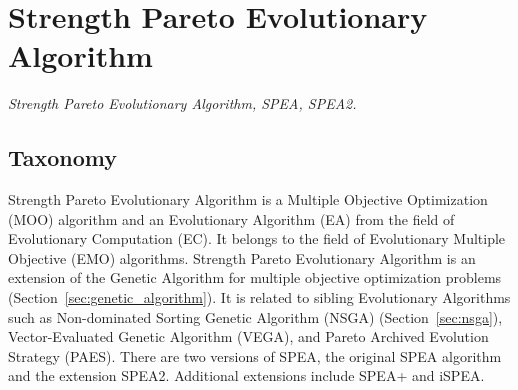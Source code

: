 

\section{Strength Pareto Evolutionary Algorithm} 
\label{sec:spea}

\emph{Strength Pareto Evolutionary Algorithm, SPEA, SPEA2.}

\subsection{Taxonomy}
Strength Pareto Evolutionary Algorithm is a Multiple Objective Optimization (MOO) algorithm and an Evolutionary Algorithm (EA) from the field of Evolutionary Computation (EC). It belongs to the field of Evolutionary Multiple Objective (EMO) algorithms.
Strength Pareto Evolutionary Algorithm is an extension of the Genetic Algorithm for multiple objective optimization problems (Section~\ref{sec:genetic_algorithm}).
It is related to sibling Evolutionary Algorithms such as Non-dominated Sorting Genetic Algorithm (NSGA) (Section~\ref{sec:nsga}), Vector-Evaluated Genetic Algorithm (VEGA), and Pareto Archived Evolution Strategy (PAES).
There are two versions of SPEA, the original SPEA algorithm and the extension SPEA2. Additional extensions include SPEA+ and iSPEA.

